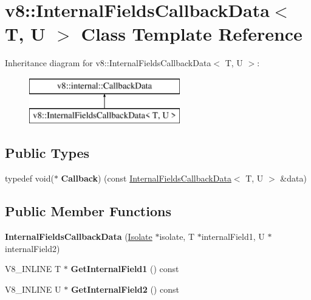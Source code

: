 \hypertarget{classv8_1_1_internal_fields_callback_data}{}\section{v8\+:\+:Internal\+Fields\+Callback\+Data$<$ T, U $>$ Class Template Reference}
\label{classv8_1_1_internal_fields_callback_data}
Inheritance diagram for v8\+:\+:Internal\+Fields\+Callback\+Data$<$ T, U $>$\+:\begin{figure}[H]
\begin{center}
\leavevmode
\includegraphics[height=2.000000cm]{classv8_1_1_internal_fields_callback_data}
\end{center}
\end{figure}
\subsection*{Public Types}
\begin{DoxyCompactItemize}
\item 
\hypertarget{classv8_1_1_internal_fields_callback_data_a9ce479def3c8c0a9d73b2b7204747a95}{}typedef void($\ast$ {\bfseries Callback}) (const \hyperlink{classv8_1_1_internal_fields_callback_data}{Internal\+Fields\+Callback\+Data}$<$ T, U $>$ \&data)\label{classv8_1_1_internal_fields_callback_data_a9ce479def3c8c0a9d73b2b7204747a95}

\end{DoxyCompactItemize}
\subsection*{Public Member Functions}
\begin{DoxyCompactItemize}
\item 
\hypertarget{classv8_1_1_internal_fields_callback_data_aa67d7551c6b33037b0fee29d6d157bb1}{}{\bfseries Internal\+Fields\+Callback\+Data} (\hyperlink{classv8_1_1_isolate}{Isolate} $\ast$isolate, T $\ast$internal\+Field1, U $\ast$internal\+Field2)\label{classv8_1_1_internal_fields_callback_data_aa67d7551c6b33037b0fee29d6d157bb1}

\item 
\hypertarget{classv8_1_1_internal_fields_callback_data_a35e848439ac60b5d3170f0882f2c29e6}{}V8\+\_\+\+I\+N\+L\+I\+N\+E T $\ast$ {\bfseries Get\+Internal\+Field1} () const \label{classv8_1_1_internal_fields_callback_data_a35e848439ac60b5d3170f0882f2c29e6}

\item 
\hypertarget{classv8_1_1_internal_fields_callback_data_a1c788384e7fe3591720fb71f50d002a5}{}V8\+\_\+\+I\+N\+L\+I\+N\+E U $\ast$ {\bfseries Get\+Internal\+Field2} () const \label{classv8_1_1_internal_fields_callback_data_a1c788384e7fe3591720fb71f50d002a5}

\end{DoxyCompactItemize}
